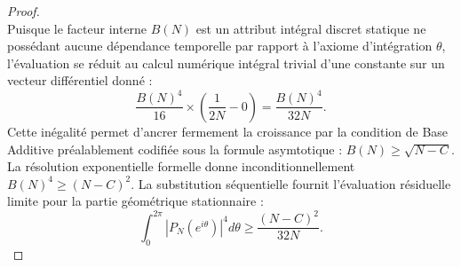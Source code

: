 \documentclass[12pt,a4paper]{article}
\begin{document}
\begin{proof}
\begin{equation}
\end{equation}
Puisque le facteur interne $B(N)$ est un attribut int\'egral discret statique ne poss\'edant aucune d\'ependance temporelle par rapport \`a l'axiome d'int\'egration $\theta$, l'\'evaluation se r\'eduit au calcul num\'erique int\'egral trivial d'une constante sur un vecteur diff\'erentiel donn\'e :
\begin{equation}
\frac{B(N)^4}{16} \times \left( \frac{1}{2N} - 0 \right) = \frac{B(N)^4}{32N}.
\end{equation}
Cette in\'egalit\'e permet d'ancrer fermement la croissance par la condition de Base Additive pr\'ealablement codifi\'ee sous la formule asymtotique : $B(N) \ge \sqrt{N - C}$. La r\'esolution exponentielle formelle donne inconditionnellement $B(N)^4 \ge (N-C)^2$. La substitution s\'equentielle fournit l'\'evaluation r\'esiduelle limite pour la partie g\'eom\'etrique stationnaire :
\begin{equation}
\int_0^{2\pi} |P_N(e^{i\theta})|^4 d\theta \ge \frac{(N-C)^2}{32N}.
\end{equation}


\end{proof}
\end{document}
